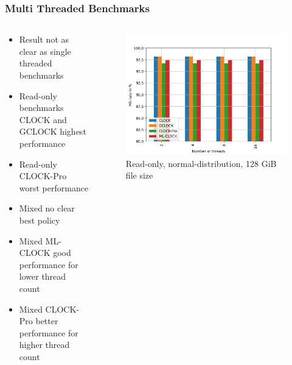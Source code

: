 \documentclass[
	aspectratio=169,
	compress,
]{beamer}
\newcommand{\navframetitle}[1]{\frametitle{#1\hfill{\footnotesize\lastsection{}}}}
\begin{document}
\begin{frame}[fragile]
	\navframetitle{Multi Threaded Benchmarks}

	\begin{columns}
		\begin{column}{0.5\textwidth}
			\begin{itemize}
				\item Result not as clear as single threaded benchmarks
				\item Read-only benchmarks CLOCK and GCLOCK highest performance
				\item Read-only CLOCK-Pro worst performance
				\item Mixed no clear best policy
				\item Mixed ML-CLOCK good performance for lower thread count
				\item Mixed CLOCK-Pro better performance for higher thread count
			\end{itemize}
		\end{column}
		\begin{column}{0.5\textwidth}
			\begin{figure}[ht]
    			\centering
    			\includegraphics[width=\textwidth]{multi_128_gb_randread_normal.jpg}
        		\caption{Read-only, normal-distribution, 128 GiB file size}
        		\label{fig:rw_90to10 128 normal}
			\end{figure}			
		\end{column}
	\end{columns}
\end{frame}
\end{document}
